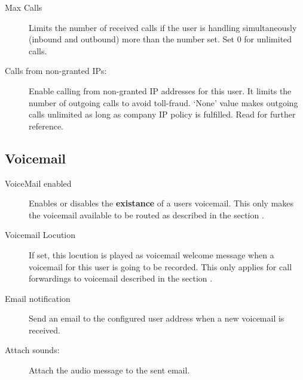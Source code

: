 \documentclass[letterpaper,10pt,english]{sphinxmanual}
\begin{document}
\begin{description}
\item[{Max Calls}] \leavevmode{}\label{company/users:term-max-calls}
Limits the number of received calls if the user is handling
simultaneously (inbound and outbound) more than the number set.
Set 0 for unlimited calls.

\item[{Calls from non-granted IPs:}] \leavevmode{}\label{company/users:term-calls-from-non-granted-ips}
Enable calling from non-granted IP addresses for this user.
It limits the number of outgoing calls to avoid toll-fraud.
`None' value makes outgoing calls unlimited as long as company IP
policy is fulfilled. Read {\hyperref[security/index:roadwarrior\string-users]{}} for further reference.

\end{description}


\subsection{Voicemail}
\label{company/users:voicemail}
\noindent{}
\begin{description}
\item[{VoiceMail enabled}] \leavevmode{}\label{company/users:term-voicemail-enabled}
Enables or disables the \textbf{existance} of a users voicemail.
This only makes the voicemail available to be routed as described in the
section {\hyperref[company/users:fwd\string-to\string-vm]{}}.

\item[{Voicemail Locution}] \leavevmode{}\label{company/users:term-voicemail-locution}
If set, this locution is played as voicemail welcome message when a voicemail
for this user is going to be recorded. This only applies for call forwardings
to voicemail described in the section {\hyperref[company/users:fwd\string-to\string-vm]{}}.

\item[{Email notification}] \leavevmode{}\label{company/users:term-email-notification}
Send an email to the configured user address when a new voicemail is
received.

\item[{Attach sounds:}] \leavevmode{}\label{company/users:term-attach-sounds}
Attach the audio message to the sent email.

\end{description}
\end{document}
